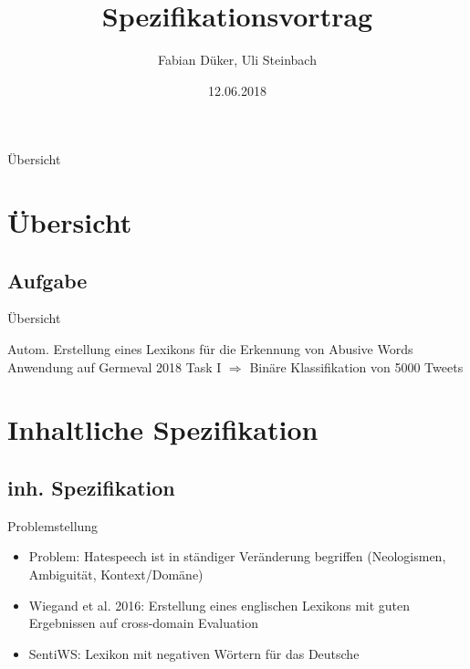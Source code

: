 \documentclass{beamer}
\begin{document}
\title[]{Spezifikationsvortrag}
\author[]{Fabian Düker, Uli Steinbach}
\date{12.06.2018}

\frame{\titlepage}
\begin{frame}[allowframebreaks]{Übersicht}
\tableofcontents
\end{frame}



\section{Übersicht}

\subsection[Aufgabe]{Aufgabe }

\begin{frame}{Übersicht}
\begin{block}{Autom. Erstellung eines Lexikons für die Erkennung von Abusive Words }
Anwendung auf Germeval 2018 Task I $\Rightarrow$ Binäre Klassifikation von 5000 Tweets 
\end{block}
\end{frame}


\section{Inhaltliche Spezifikation}
\subsection[inh. Spez.]{ inh. Spezifikation }

\begin{frame}{Problemstellung}
\begin{itemize}
	\item Problem: Hatespeech ist in ständiger Veränderung begriffen (Neologismen, Ambiguität, Kontext/Domäne)
	\item Wiegand et al. 2016: Erstellung eines englischen Lexikons mit guten Ergebnissen auf cross-domain Evaluation
	\item SentiWS: Lexikon mit negativen Wörtern für das Deutsche
	
\end{itemize}
\end{frame}
\end{document}
